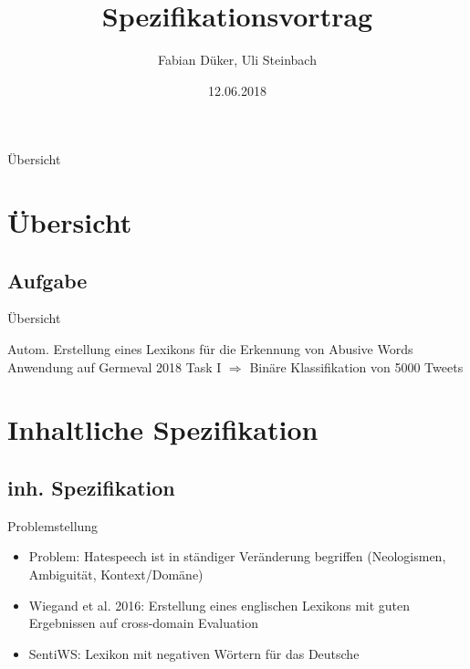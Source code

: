 \documentclass{beamer}
\begin{document}
\title[]{Spezifikationsvortrag}
\author[]{Fabian Düker, Uli Steinbach}
\date{12.06.2018}

\frame{\titlepage}
\begin{frame}[allowframebreaks]{Übersicht}
\tableofcontents
\end{frame}



\section{Übersicht}

\subsection[Aufgabe]{Aufgabe }

\begin{frame}{Übersicht}
\begin{block}{Autom. Erstellung eines Lexikons für die Erkennung von Abusive Words }
Anwendung auf Germeval 2018 Task I $\Rightarrow$ Binäre Klassifikation von 5000 Tweets 
\end{block}
\end{frame}


\section{Inhaltliche Spezifikation}
\subsection[inh. Spez.]{ inh. Spezifikation }

\begin{frame}{Problemstellung}
\begin{itemize}
	\item Problem: Hatespeech ist in ständiger Veränderung begriffen (Neologismen, Ambiguität, Kontext/Domäne)
	\item Wiegand et al. 2016: Erstellung eines englischen Lexikons mit guten Ergebnissen auf cross-domain Evaluation
	\item SentiWS: Lexikon mit negativen Wörtern für das Deutsche
	
\end{itemize}
\end{frame}
\end{document}
